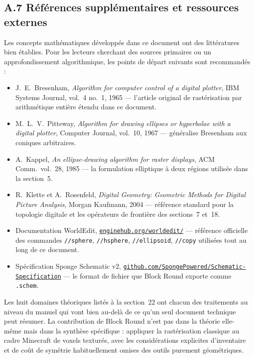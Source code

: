 \documentclass[12pt,a4paper]{scrartcl}
\newcommand{\code}[1]{\texttt{\small #1}}
\newcommand{\cmd}[1]{\textcolor{earth}{\texttt{\small #1}}}
\newcommand{\biblink}[2]{\href{#1}{\nolinkurl{#2}}}
\begin{document}
\subsection*{A.7 Références supplémentaires et ressources externes}

Les concepts mathématiques développés dans ce document ont des littératures bien établies. Pour les lecteurs cherchant des sources primaires ou un approfondissement algorithmique, les points de départ suivants sont recommandés :

\begin{itemize}[leftmargin=1.4em,itemsep=0.2em,topsep=0.3em]
  \item J.~E.~Bresenham, \emph{Algorithm for computer control of a digital plotter}, IBM Systems Journal, vol.~4 no.~1, 1965 --- l'article original de rastérisation par arithmétique entière étendu dans ce document.
  \item M.~L.~V.~Pitteway, \emph{Algorithm for drawing ellipses or hyperbolae with a digital plotter}, Computer Journal, vol.~10, 1967 --- généralise Bresenham aux coniques arbitraires.
  \item A.~Kappel, \emph{An ellipse-drawing algorithm for raster displays}, ACM Comm.\ vol.~28, 1985 --- la formulation elliptique à deux régions utilisée dans la section~5.
  \item R.~Klette et A.~Rosenfeld, \emph{Digital Geometry: Geometric Methods for Digital Picture Analysis}, Morgan Kaufmann, 2004 --- référence standard pour la topologie digitale et les opérateurs de frontière des sections~7 et~18.
  \item Documentation WorldEdit, \biblink{https://enginehub.org/worldedit/}{enginehub.org/worldedit/} --- référence officielle des commandes \cmd{//sphere}, \cmd{//hsphere}, \cmd{//ellipsoid}, \cmd{//copy} utilisées tout au long de ce document.
  \item Spécification Sponge Schematic v2, \biblink{https://github.com/SpongePowered/Schematic-Specification}{github.com/SpongePowered/Schematic-Specification} --- le format de fichier que Block Round exporte comme \code{.schem}.
\end{itemize}

Les huit domaines théoriques listés à la section~22 ont chacun des traitements au niveau du manuel qui vont bien au-delà de ce qu'un seul document technique peut résumer. La contribution de Block Round n'est pas dans la théorie elle-même mais dans la synthèse spécifique : appliquer la rastérisation classique au cadre Minecraft de voxels texturés, avec les considérations explicites d'inventaire et de coût de symétrie habituellement omises des outils purement géométriques.
\end{document}

